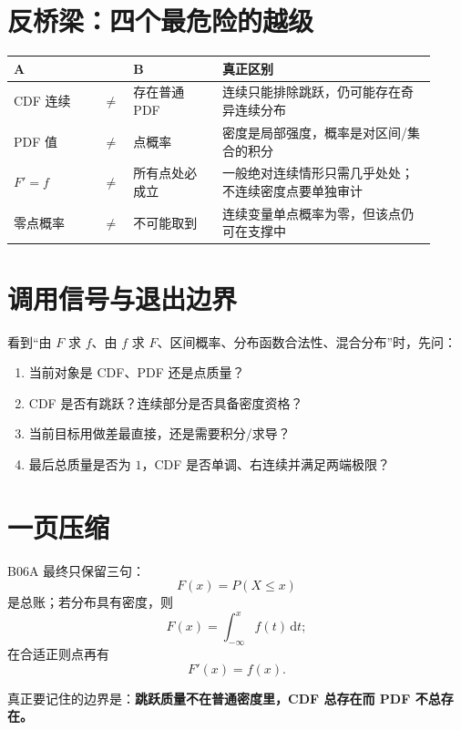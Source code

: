 \documentclass[profile=standard]{ipara-handbook}
\begin{document}
\section{反桥梁：四个最危险的越级}
\begin{tabular}{p{0.20\linewidth}p{0.04\linewidth}p{0.20\linewidth}p{0.48\linewidth}}
\hline
A & & B & 真正区别\\
\hline
CDF 连续 & $\neq$ & 存在普通 PDF & 连续只能排除跳跃，仍可能存在奇异连续分布\\
PDF 值 & $\neq$ & 点概率 & 密度是局部强度，概率是对区间/集合的积分\\
$F'=f$ & $\neq$ & 所有点处必成立 & 一般绝对连续情形只需几乎处处；不连续密度点要单独审计\\
零点概率 & $\neq$ & 不可能取到 & 连续变量单点概率为零，但该点仍可在支撑中\\
\hline
\end{tabular}

\section{调用信号与退出边界}
看到“由 $F$ 求 $f$、由 $f$ 求 $F$、区间概率、分布函数合法性、混合分布”时，先问：
\begin{enumerate}
\item 当前对象是 CDF、PDF 还是点质量？
\item CDF 是否有跳跃？连续部分是否具备密度资格？
\item 当前目标用做差最直接，还是需要积分/求导？
\item 最后总质量是否为 $1$，CDF 是否单调、右连续并满足两端极限？
\end{enumerate}

\section{一页压缩}
B06A 最终只保留三句：
\[
\boxed{F(x)=P(X\le x)}
\]
是总账；若分布具有密度，则
\[
\boxed{F(x)=\int_{-\infty}^{x}f(t)\,\mathrm{d}t};
\]
在合适正则点再有
\[
\boxed{F'(x)=f(x)}.
\]

真正要记住的边界是：\textbf{跳跃质量不在普通密度里，CDF 总存在而 PDF 不总存在。}
\end{document}
